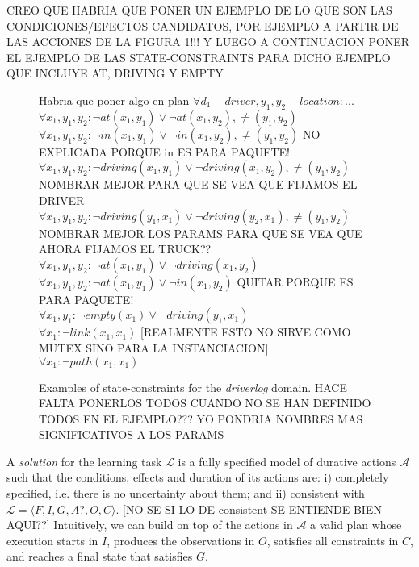 \documentclass{ecai}
\newcommand{\tup}[1]{{\langle #1 \rangle}}
\begin{document}
CREO QUE HABRIA QUE PONER UN EJEMPLO DE LO QUE SON LAS CONDICIONES/EFECTOS CANDIDATOS, POR EJEMPLO A PARTIR DE LAS ACCIONES DE LA FIGURA 1!!! Y LUEGO A CONTINUACION PONER EL EJEMPLO DE LAS STATE-CONSTRAINTS PARA DICHO EJEMPLO QUE INCLUYE AT, DRIVING Y EMPTY


\begin{figure}
  \begin{scriptsize}
Habria que poner algo en plan $\forall d_1 - driver, y_1,y_2 - location: ...$ \\
$\forall x_1,y_1,y_2: \neg at(x_1,y_1)\vee\neg at(x_1,y_2), \neq (y_1,y_2)$\\
$\forall x_1,y_1,y_2: \neg in(x_1,y_1)\vee\neg in(x_1,y_2), \neq (y_1,y_2)$  NO EXPLICADA PORQUE in ES PARA PAQUETE! \\
$\forall x_1,y_1,y_2: \neg driving(x_1,y_1)\vee\neg driving(x_1,y_2), \neq (y_1,y_2)$ NOMBRAR MEJOR PARA QUE SE VEA QUE FIJAMOS EL DRIVER\\
$\forall x_1,y_1,y_2: \neg driving(y_1,x_1)\vee\neg driving(y_2,x_1), \neq (y_1,y_2)$  NOMBRAR MEJOR LOS PARAMS PARA QUE SE VEA QUE AHORA FIJAMOS EL TRUCK?? \\
$\forall x_1,y_1,y_2: \neg at(x_1,y_1)\vee\neg driving(x_1,y_2)$\\
$\forall x_1,y_1,y_2: \neg at(x_1,y_1)\vee\neg in(x_1,y_2)$ QUITAR PORQUE ES PARA PAQUETE! \\
$\forall x_1,y_1: \neg empty(x_1)\vee\neg driving(y_1,x_1)$\\
$\forall x_1: \neg link(x_1,x_1)$ [REALMENTE ESTO NO SIRVE COMO MUTEX SINO PARA LA INSTANCIACION] \\
$\forall x_1: \neg path(x_1,x_1)$\\
\end{scriptsize}      
\caption{Examples of state-constraints for the {\em driverlog} domain. HACE FALTA PONERLOS TODOS CUANDO NO SE HAN DEFINIDO TODOS EN EL EJEMPLO??? YO PONDRIA NOMBRES MAS SIGNIFICATIVOS A LOS PARAMS}
\label{fig:example-statecs}
\end{figure}


A {\em solution} for the learning task $\mathcal{L}$ is a fully specified model of durative actions $\mathcal{A}$ such that the conditions, effects and duration of its actions are: i) completely specified, i.e. there is no uncertainty about them; and ii) 
{consistent} with $\mathcal{L}=\tup{F,I,G,A?,O,C}$. [NO SE SI LO DE consistent SE ENTIENDE BIEN AQUI??] Intuitively, we can build on top of the actions in $\mathcal{A}$ a valid plan whose execution starts in $I$, produces the observations in $O$, satisfies all constraints in $C$, and reaches a final state that satisfies $G$. 
\end{document}
